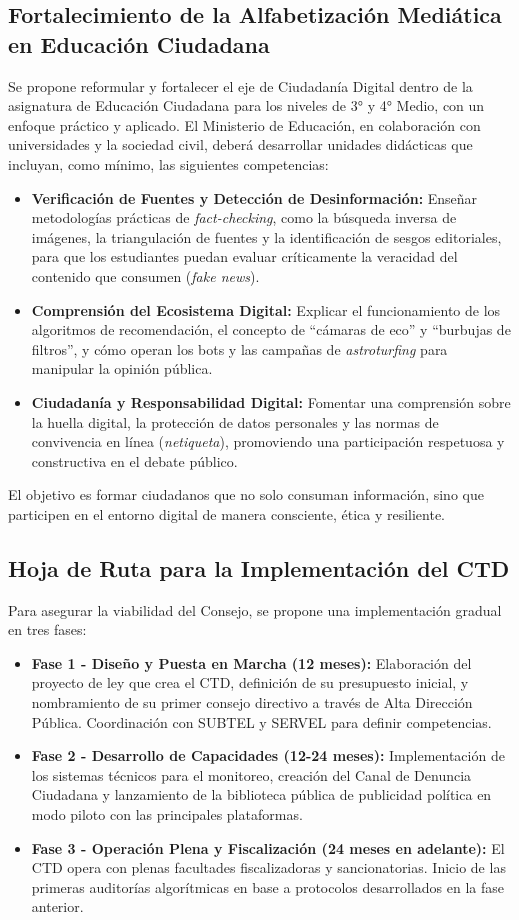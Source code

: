 \documentclass[12pt, letterpaper]{article}
\begin{document}
\subsection{Fortalecimiento de la Alfabetización Mediática en Educación Ciudadana}
Se propone reformular y fortalecer el eje de Ciudadanía Digital dentro de la asignatura de Educación Ciudadana para los niveles de 3° y 4° Medio, con un enfoque práctico y aplicado. El Ministerio de Educación, en colaboración con universidades y la sociedad civil, deberá desarrollar unidades didácticas que incluyan, como mínimo, las siguientes competencias:
\begin{itemize}[leftmargin=*, itemsep=0.5em]
	\item \textbf{Verificación de Fuentes y Detección de Desinformación:} Enseñar metodologías prácticas de \textit{fact-checking}, como la búsqueda inversa de imágenes, la triangulación de fuentes y la identificación de sesgos editoriales, para que los estudiantes puedan evaluar críticamente la veracidad del contenido que consumen (\textit{fake news}).
	\item \textbf{Comprensión del Ecosistema Digital:} Explicar el funcionamiento de los algoritmos de recomendación, el concepto de ``cámaras de eco'' y ``burbujas de filtros'', y cómo operan los bots y las campañas de \textit{astroturfing} para manipular la opinión pública.
	\item \textbf{Ciudadanía y Responsabilidad Digital:} Fomentar una comprensión sobre la huella digital, la protección de datos personales y las normas de convivencia en línea (\textit{netiqueta}), promoviendo una participación respetuosa y constructiva en el debate público.
\end{itemize}
El objetivo es formar ciudadanos que no solo consuman información, sino que participen en el entorno digital de manera consciente, ética y resiliente.

\subsection{Hoja de Ruta para la Implementación del CTD}
Para asegurar la viabilidad del Consejo, se propone una implementación gradual en tres fases:
\begin{itemize}[leftmargin=*, itemsep=0.5em]
	\item \textbf{Fase 1 - Diseño y Puesta en Marcha (12 meses):} Elaboración del proyecto de ley que crea el CTD, definición de su presupuesto inicial, y nombramiento de su primer consejo directivo a través de Alta Dirección Pública. Coordinación con SUBTEL y SERVEL para definir competencias.
	\item \textbf{Fase 2 - Desarrollo de Capacidades (12-24 meses):} Implementación de los sistemas técnicos para el monitoreo, creación del Canal de Denuncia Ciudadana y lanzamiento de la biblioteca pública de publicidad política en modo piloto con las principales plataformas.
	\item \textbf{Fase 3 - Operación Plena y Fiscalización (24 meses en adelante):} El CTD opera con plenas facultades fiscalizadoras y sancionatorias. Inicio de las primeras auditorías algorítmicas en base a protocolos desarrollados en la fase anterior.
\end{itemize}
\end{document}
